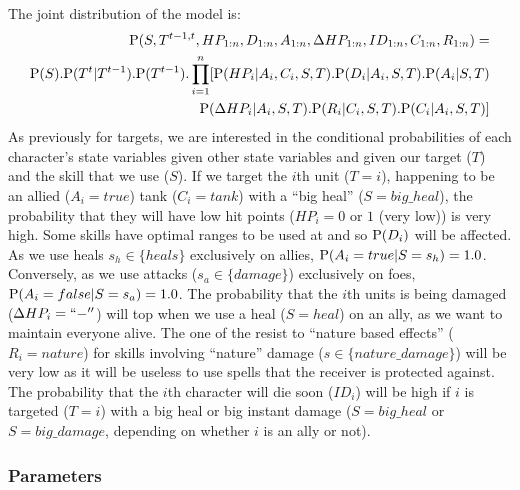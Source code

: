 The joint distribution of the model is: 
\begin{eqnarray}
\mathrm{P}(S, T^{t-1,t}, HP_{1:n}, D_{1:n}, A_{1:n}, \Delta HP_{1:n}, ID_{1:n}, C_{1:n}, R_{1:n}) = \\
\mathrm{P}(S).\mathrm{P}(T^t|T^{t-1}).\mathrm{P}(T^{t-1}).\prod_{i=1}^n [ \mathrm{P}(HP_i | A_i, C_i, S, T).\mathrm{P}(D_i | A_i, S, T).\mathrm{P}(A_i | S, T) \\
        \mathrm{P}(\Delta HP_i | A_i, S, T). \mathrm{P}(R_i | C_i, S, T). \mathrm{P}(C_i | A_i, S, T) ]
\end{eqnarray}
As previously for targets, we are interested in the conditional probabilities of each character's state variables given other state variables and given our target ($T$) and the skill that we use ($S$). If we target the $i$th unit ($T=i$), happening to be an allied ($A_i=true$) tank ($C_i=tank$) with a ``big heal'' ($S=big\_heal$), the probability that they will have low hit points ($HP_i=0$ or $1$ (very low)) is very high. Some skills have optimal ranges to be used at and so $\mathrm{P}(D_i)$ will be affected. As we use heals $s_h\in \{heals\}$ exclusively on allies, $\mathrm{P}(A_i=true|S=s_h) =1.0$. Conversely, as we use attacks ($s_a\in \{damage\}$) exclusively on foes, $\mathrm{P}(A_i=false|S=s_a)=1.0$. The probability that the $i$th units is being damaged ($\Delta HP_i=``-''$) will top when we use a heal ($S=heal$) on an ally, as we want to maintain everyone alive. The one of the resist to ``nature based effects'' ($R_i=nature$) for skills involving ``nature'' damage ($s \in \{nature\_damage\}$) will be very low as it will be useless to use spells that the receiver is protected against. The probability that the $i$th character will die soon ($ID_i$) will be high if $i$ is targeted ($T=i$) with a big heal or big instant damage ($S=big\_heal$ or $S=big\_damage$, depending on whether $i$ is an ally or not). %


\subsubsection{Parameters}

